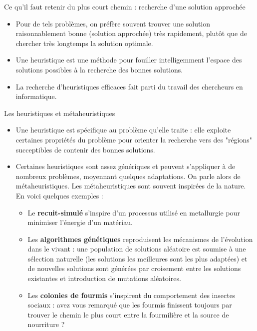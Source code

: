 \begin{frame}{Ce qu'il faut retenir du plus court chemin : recherche d'une solution approchée}

  \begin{itemize}
    \item Pour de tels problèmes, on préfère souvent trouver une solution raisonnablement bonne (solution approchée) très rapidement, plutôt que de chercher très longtemps la solution optimale. 
    \item Une \alert{heuristique} est une méthode pour fouiller intelligemment l'espace des solutions possibles à la recherche des bonnes solutions.
    \item La recherche d'heuristiques efficaces fait parti du travail des chercheurs en informatique.
  \end{itemize}
  
  \begin{block}{Les heuristiques et métaheuristiques}

    \begin{itemize}
      \item Une heuristique est spécifique au problème qu'elle traite : elle exploite certaines propriétés du problème pour orienter la recherche vers des "régions" succeptibles de contenir des bonnes solutions.
      \item Certaines heuristiques sont assez génériques et peuvent s'appliquer à de nombreux problèmes, moyennant quelques adaptations. On parle alors de \alert{métaheuristiques}. Les métaheuristiques sont souvent inspirées de la nature. En voici quelques exemples : 
        \begin{itemize}
          \item Le \textbf{recuit-simulé} s'inspire d'un processus utilisé en metallurgie pour minimiser l'énergie d'un matériau.
          \item Les \textbf{algorithmes génétiques} reproduisent les mécanismes de l'évolution dans le vivant : une population de solutions aléatoire est soumise à une sélection naturelle (les solutions les meilleures sont les plus adaptées) et de nouvelles solutions sont générées par croisement entre les solutions existantes et introduction de mutations aléatoires.
          \item Les \textbf{colonies de fourmis} s'inspirent du comportement des insectes sociaux : avez vous remarqué que les fourmis finissent toujours par trouver le chemin le plus court entre la fourmilière et la source de nourriture ?
        \end{itemize}
    \end{itemize}
  \end{block}


\end{frame}
